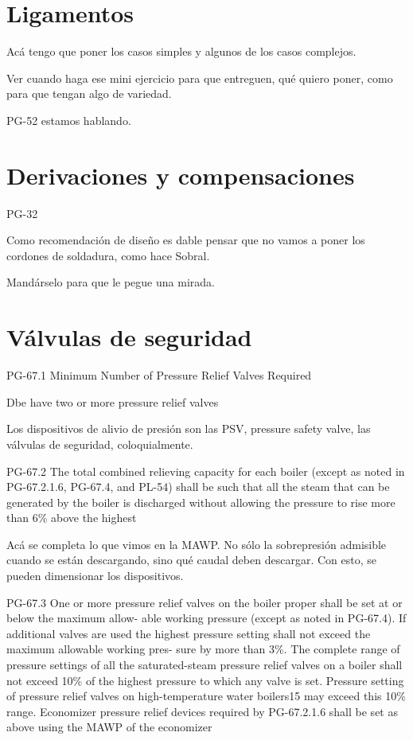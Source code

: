 \newpage
\section{Ligamentos}

Acá tengo que poner los casos simples y algunos de los casos complejos.

Ver cuando haga ese mini ejercicio para que entreguen, qué quiero poner, como para que tengan algo de variedad.



PG-52 estamos hablando.






\newpage
\section{Derivaciones y compensaciones}

PG-32

Como recomendación de diseño es dable pensar que no vamos a poner los cordones de soldadura, como hace Sobral.

Mandárselo para que le pegue una mirada.


\newpage
\section{Válvulas de seguridad}

PG-67.1
Minimum Number of Pressure Relief Valves Required

Dbe have two or more pressure relief valves

Los dispositivos de alivio de presión son las PSV, pressure safety valve, las válvulas de seguridad, coloquialmente.


PG-67.2
The total combined relieving capacity for
each boiler (except as noted in PG-67.2.1.6, PG-67.4,
and PL-54) shall be such that all the steam that can be
generated by the boiler is discharged without allowing
the pressure to rise more than 6\% above the highest

Acá se completa lo que vimos en la MAWP. No sólo la sobrepresión admisible cuando se están descargando, sino qué caudal deben descargar. Con esto, se pueden dimensionar los dispositivos.

PG-67.3
One or more pressure relief valves on the
boiler proper shall be set at or below the maximum allow-
able working pressure (except as noted in PG-67.4). If
additional valves are used the highest pressure setting
shall not exceed the maximum allowable working pres-
sure by more than 3\%. The complete range of pressure
settings of all the saturated-steam pressure relief valves
on a boiler shall not exceed 10\% of the highest pressure to
which any valve is set. Pressure setting of pressure relief
valves on high-temperature water boilers15 may exceed
this 10\% range. Economizer pressure relief devices
required by PG-67.2.1.6 shall be set as above using the
MAWP of the economizer


